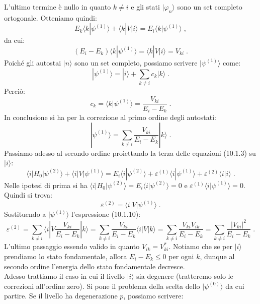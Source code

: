 \documentclass[12pt,a4paper]{report}
\theoremstyle{definition}
\numberwithin{equation}{section}
\newcommand{\bra}{\langle}
\newcommand{\ket}{\rangle}
\begin{document}
L'ultimo termine è nullo in quanto $k\ne i$ e gli stati $|\varphi_n\ket$ sono un set completo ortogonale. Otteniamo quindi:
\begin{equation}
E_k\bra k|\psi^{(1)}\ket+\bra k|V|i\ket=E_i\bra k|\psi^{(1)}\ket\;,
\end{equation}
da cui:
\begin{equation}
(E_i-E_k)\bra k|\psi^{(1)}\ket=\bra k|V|i\ket= V_{ki}\;.
\end{equation}
Poiché gli autostai $|n\ket$ sono un set completo, possiamo scrivere $|\psi^{(1)}\ket$ come:
\begin{equation}
|\psi^{(1)}\ket=|i\ket+\sum_{k\ne i}c_k|k\ket\;.
\end{equation}
Perciò:
\begin{equation}
c_k=\bra k|\psi^{(1)}\ket=\frac{V_{ki}}{E_i-E_k}\;.
\end{equation}
In conclusione si ha per la correzione al primo ordine degli autostati:
\begin{equation}
|\psi^{(1)}\ket=\sum_{k\ne i} \frac{V_{ki}}{E_i-E_k}|k\ket\;.
\end{equation}
Passiamo adesso al secondo ordine proiettando la terza delle equazioni (10.1.3) su $|i\ket$:
\begin{equation*}
\bra i|H_0|\psi^{(2)}\ket+\bra i|V|\psi^{(1)}\ket=E_i\bra i|\psi^{(2)}\ket+\varepsilon^{(1)}\bra i|\psi^{(1)}\ket+\varepsilon^{(2)}\bra i|i\ket\;.
\end{equation*}
Nelle ipotesi di prima si ha $\bra i|H_0|\psi^{(2)}\ket=E_i\bra i|\psi^{(2)}\ket=0$ e $\varepsilon^{(1)}\bra i |\psi^{(1)}\ket=0$. Quindi si trova:
\begin{equation}
\varepsilon^{(2)}=\bra i|V|\psi^{(1)}\ket\;.
\end{equation}
Sostituendo a $|\psi^{(1)}\ket$ l'espressione (10.1.10):
\begin{equation}
\varepsilon^{(2)}=\sum_{k\ne i}\bra i|V\frac{V_{ki}}{E_i-E_k}|k\ket=\sum_{k\ne i}\frac{V_{ki}}{E_i-E_k}\bra i|V|k\ket=\sum_{k\ne i} \frac{V_{ki}V_{ik}}{E_i-E_k}=\sum_{k\ne i}\frac{|V_{ki}|^2}{E_i-E_k}\;.
\end{equation}
L'ultimo passaggio essendo valido in quanto $V_{ik}=V_{ki}^*$. Notiamo che se per $|i\ket$ prendiamo lo stato fondamentale, allora $E_i-E_k\le 0$ per ogni $k$, dunque al secondo ordine l'energia dello stato fondamentale decresce. \\
Adesso trattiamo il caso in cui il livello $|i\ket$ sia degenere (tratteremo solo le correzioni all'ordine zero). Si pone il problema della scelta dello $|\psi^{(0)}\ket$ da cui partire. Se il livello ha degenerazione $p$, possiamo scrivere:
\end{document}
